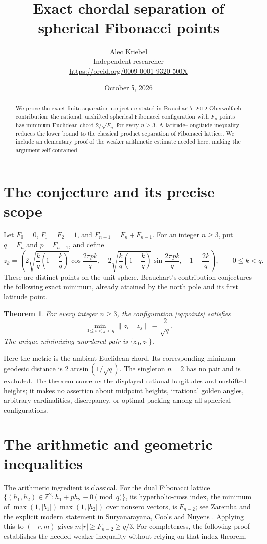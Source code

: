 \documentclass[11pt]{article}
\title{Exact chordal separation of spherical Fibonacci points}
\author{Alec Kriebel\\Independent researcher\\
\small\url{https://orcid.org/0009-0001-9320-500X}}
\date{October 5, 2026}
\newtheorem{theorem}{Theorem}
\newcommand{\Z}{\mathbb Z}
\begin{document}
\maketitle
\begin{abstract}
We prove the exact finite separation conjecture stated in Brauchart's
2012 Oberwolfach contribution: the rational, unshifted spherical Fibonacci
configuration with $F_n$ points has minimum Euclidean chord $2/\sqrt{F_n}$
for every $n\geq3$. A latitude--longitude inequality reduces the lower
bound to the classical product separation of Fibonacci lattices. We
include an elementary proof of the weaker arithmetic estimate needed
here, making the argument self-contained.
\end{abstract}

\section{The conjecture and its precise scope}
Let $F_0=0$, $F_1=F_2=1$, and $F_{n+1}=F_n+F_{n-1}$. For an integer
$n\geq3$, put $q=F_n$ and $p=F_{n-1}$, and define
\begin{equation}\label{eq:points}
 z_k=\left(2\sqrt{\frac{k}{q}\left(1-\frac{k}{q}\right)}
 \cos\frac{2\pi pk}{q},\quad
 2\sqrt{\frac{k}{q}\left(1-\frac{k}{q}\right)}
 \sin\frac{2\pi pk}{q},\quad 1-\frac{2k}{q}\right),
 \qquad 0\leq k<q.
\end{equation}
These are distinct points on the unit sphere. Brauchart's contribution
\cite[pp.~2436--2439, especially p.~2438]{Brauchart} conjectures the
following exact minimum, already attained by the north pole and its
first latitude point.
\begin{theorem}\label{thm:main}
For every integer $n\geq3$, the configuration \eqref{eq:points} satisfies
\[
 \min_{0\leq i<j<q}\|z_i-z_j\|=\frac{2}{\sqrt q}.
\]
The unique minimizing unordered pair is $\{z_0,z_1\}$.
\end{theorem}
Here the metric is the ambient Euclidean chord. Its corresponding
minimum geodesic distance is $2\arcsin(1/\sqrt q)$. The singleton $n=2$
has no pair and is excluded. The theorem concerns the displayed rational
longitudes and unshifted heights; it makes no assertion about midpoint
heights, irrational golden angles, arbitrary cardinalities, discrepancy,
or optimal packing among all spherical configurations.

\section{The arithmetic and geometric inequalities}
The arithmetic ingredient is classical. For the dual Fibonacci lattice
$\{(h_1,h_2)\in\Z^2:h_1+ph_2\equiv0\pmod q\}$, its hyperbolic-cross
index, the minimum of
$\max(1,|h_1|)\max(1,|h_2|)$ over nonzero vectors, is $F_{n-2}$;
see Zaremba \cite[p.~186]{Zaremba} and the explicit modern statement in
Suryanarayana, Cools and Nuyens \cite[Theorem~2.2]{SCN}.
Applying this to $(-r,m)$ gives $m|r|\geq F_{n-2}\geq q/3$.
For completeness, the following proof establishes the needed weaker
inequality without relying on that index theorem.
\end{document}
